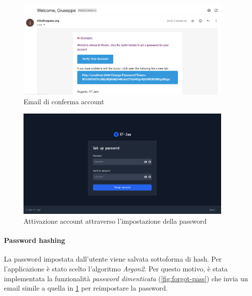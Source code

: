 \documentclass{article}
\begin{document}
\begin{figure}[h]
  \begin{center}
    \includegraphics[width=0.95\textwidth]{figures/register_email.png}
  \end{center}
  \caption{Email di conferma account}\label{fig:register-email}
\end{figure}

\begin{figure}[h]
  \begin{center}
    \includegraphics[width=0.95\textwidth]{figures/setpass_page.png}
  \end{center}
  \caption{Attivazione account attraverso l'impostazione della password}\label{fig:setpassword}
\end{figure}

\paragraph{Password hashing} La password impostata dall'utente viene salvata sottoforma di 
hash. Per l'applicazione è stato scelto l'algoritmo \textit{Argon2}. Per questo motivo, è
stata implementata la funzionalità \textit{password dimenticata} (\cref{fig:forgot-pass})
che invia un email simile a quella in \cref{fig:register-email} per reimpostare 
la password.
\end{document}

